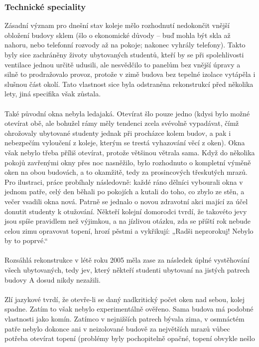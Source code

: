 \subsubsection{Technické speciality}
Zásadní význam pro dnešní stav koleje mělo rozhodnutí nedokončit vnější obložení
budovy sklem (šlo o ekonomické důvody – buď mohla být skla až nahoru, nebo
telefonní rozvody až na pokoje; nakonec vyhrály telefony). Takto byly sice
zachráněny životy ubytovaných studentů, kteří by se při spolehlivosti ventilace
jednou určitě udusili, ale nesvědčilo to panelům bez vnější úpravy a silně to
prodražovalo provoz, protože v zimě budova bez tepelné izolace vytápěla i
slušnou část okolí. Tato vlastnost sice byla odstraněna rekonstrukcí před
několika lety, jiná specifika však zůstala.
\\\\
Také původní okna nebyla ledajaká. Otevírat šlo pouze jedno (kdysi bylo možné
otevírat obě, ale bohužel rámy měly tendenci zcela svévolně vypadávat, čímž
ohrožovaly ubytované studenty jednak při procházce kolem budov, a pak i
nebezpečím vyloučení z koleje, kterým se trestá vyhazování věcí z oken). Okna
však nebylo třeba příliš otevírat, protože většinou větrala sama. Když do
několika pokojů zavřenými okny přes noc nasněžilo, bylo rozhodnuto o kompletní
výměně oken na obou budovách, a to okamžitě, tedy za prosincových třeskutých
mrazů. Pro ilustraci, práce probíhaly následovně: každé ráno dělníci vybourali
okna v jednom patře, celý den běhali po pokojích a kutali do toho, co zbylo ze
stěn, a večer vsadili okna nová. Patrně se jednalo o novou zdravotní akci mající
za účel donutit studenty k otužování. Někteří kolejní domorodci tvrdí, že
takovéto jevy jsou spíše pravidlem než výjimkou, a na jízlivou otázku, zda se
příští rok nebude celou zimu opravovat topení, hrozí pěstmi a vykřikují: „Radši
neprorokuj! Nebylo by to poprvé.“
\\\\
Rozsáhlá rekonstrukce v létě roku 2005 měla zase za následek úplné vystěhování
všech ubytovaných, tedy jev, který někteří studenti ubytovaní na jistých patrech
budovy A dosud nikdy nezažili.
\\\\
Zlí jazykové tvrdí, že otevře-li se daný nadkritický počet oken nad sebou, kolej
spadne. Zatím to však nebylo experimentálně ověřeno. Sama budova má podobné
vlastnosti jako komín. Zatímco v nejnižších patrech bývala zima, v osmnáctém
patře nebylo dokonce ani v neizolované budově za největších mrazů vůbec potřeba
otevírat topení (problémy byly pochopitelně opačné, topení obvykle nešlo
